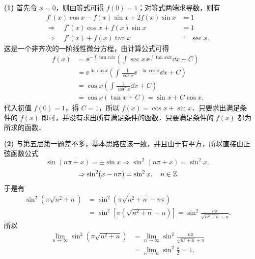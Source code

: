 \begin{solution}
  \textbf{(1)} 首先令 $x=0$，则由等式可得 $f(0)=1$；对等式两端求导数，则有
  \begin{align*}
    f'(x)\cos x-f(x)\sin x+2f(x)\sin x&=1\\
    \Rightarrow\quad f'(x)\cos x+f(x)\sin x&=1\\
    \Rightarrow\quad f'(x)+f(x)\tan x&=\sec x.
  \end{align*}
  这是一个非齐次的一阶线性微分方程，由计算公式可得
  \begin{align*}
    f(x)&=\ee^{-\int\tan x\dd x}\left(\int\sec x\,\ee^{\int\tan x\dd x}\dd x+C\right)\\
    &=\ee^{\ln\cos x}\left(\int\frac{1}{\cos x}\ee^{-\ln\cos x}\dd x+C\right)\\
    &=\cos x\left(\int\frac{1}{\cos^2 x}\dd x+C\right)\\
    &=\cos x(\tan x+C)=\sin x+C\cos x.
  \end{align*}
  代入初值 $f(0)=1$，得 $C=1$，所以 $f(x)=\cos x+\sin x$．只要求出满足条件的 $f(x)$ 即可，并没有求出所有满足条件的函数．只要满足条件的 $f(x)$ 都为所求的函数．

  \textbf{(2)} 与第五届第一题差不多，基本思路应该一致，并且由于有平方，所以直接由正弦函数公式
  \[
    \sin(n\pi+x)=\pm\sin x\Rightarrow\sin^2(n\pi+x)=\sin^2 x,
  \]
  \[
    \Rightarrow\sin^2(x-n\pi)=\sin^2 x,\quad n\in\mathbb{Z}
  \]
  于是有
  \begin{align*}
    \sin^2\left(\pi\sqrt{n^2+n}\right)
    &=\sin^2\left(\pi\sqrt{n^2+n}-n\pi\right)\\
    &=\sin^2\left[\pi\left(\sqrt{n^2+n}-n\right)\right]
     =\sin^2\frac{n\pi}{\sqrt{n^2+n}+n}.
  \end{align*}
  所以
  \begin{align*}
    \lim_{n\to\infty}\sin^2\left(\pi\sqrt{n^2+n}\right)
    &=\lim_{n\to\infty}\sin^2\frac{n\pi}{\sqrt{n^2+n}+n}\\
    &=\lim_{n\to\infty}\sin^2\frac{\pi}{2}=1.
  \end{align*}


\end{solution}
